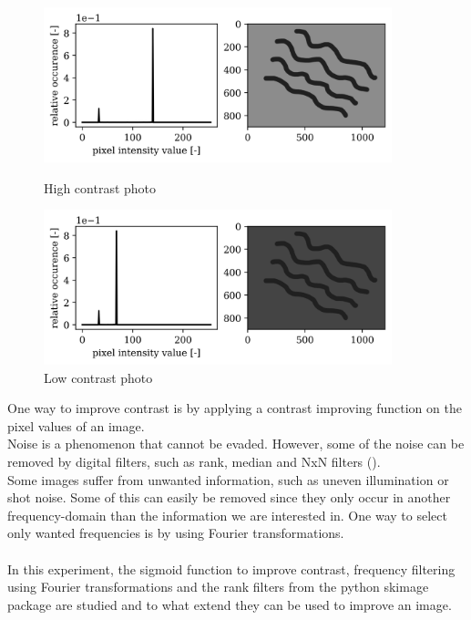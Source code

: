 \begin{figure}[h!]
    \centering
    \begin{minipage}{.5\textwidth}
      \centering
      \includegraphics[width=0.9\textwidth,keepaspectratio]{afbeeldingen/histograms/highcontrast.png}
      \caption{High contrast photo}
      \label{fig:hcphoto}
    \end{minipage}%
    \begin{minipage}{.5\textwidth}
      \centering
      \includegraphics[width=0.9\textwidth,keepaspectratio]{afbeeldingen/histograms/lowcontrast.png}
      \caption{Low contrast photo}
      \label{fig:lcphoto}
    \end{minipage}
\end{figure}

One way to improve contrast is by applying a contrast improving function on the pixel values of an image.\\
Noise is a phenomenon that cannot be evaded. However, some of the noise can be removed by digital filters, such as rank, median and NxN filters (\cite{tutorial}). \\
Some images suffer from unwanted information, such as uneven illumination or shot noise. Some of this can easily be removed since they only  occur in another frequency-domain than the information we are interested in. One way to select only wanted frequencies is by using Fourier transformations.\\
\\
In this experiment, the sigmoid function to improve contrast, frequency filtering using Fourier transformations and the rank filters from the python skimage package are studied and to what extend they can be used to improve an image.



